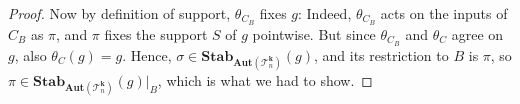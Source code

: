 \documentclass[11pt]{article}
\newcommand{\Aut}{\mathbf{Aut}}
\newcommand{\Stab}{\mathbf{Stab}}
\newcommand{\Tt}{{\mathcal T}}
\theoremstyle{definition}
\theoremstyle{plain}
\theoremstyle{remark}
\theoremstyle{remark}
\begin{document}
\begin{proof}
	Now by definition of support, $\theta_{C_B}$ fixes $g$: Indeed, $\theta_{C_B}$ acts on the inputs of $C_B$ as $\pi$, and $\pi$ fixes the support $S$ of $g$ pointwise. But since $\theta_{C_B}$ and $\theta_C$ agree on $g$, also $\theta_C(g) = g$. Hence, $\sigma \in \Stab_{\Aut(\Tt_n^{\boldsymbol{k}})}(g)$, and its restriction to $B$ is $\pi$, so $\pi \in \Stab_{\Aut(\Tt_n^{\boldsymbol{k}})}(g)|_B$, which is what we had to show.
\end{proof}	
\end{document}
